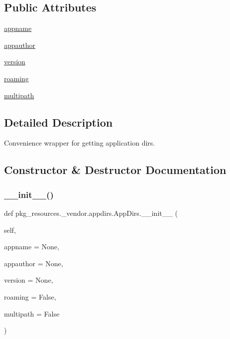 \subsection*{Public Attributes}
\begin{DoxyCompactItemize}
\item 
\hyperlink{classpkg__resources_1_1__vendor_1_1appdirs_1_1AppDirs_afed8cca9642ffb41bd6e08a7cd1c078a}{appname}
\item 
\hyperlink{classpkg__resources_1_1__vendor_1_1appdirs_1_1AppDirs_a69ef562eba9aecf3e8d06c73ebb6e1da}{appauthor}
\item 
\hyperlink{classpkg__resources_1_1__vendor_1_1appdirs_1_1AppDirs_af0b4120c1952529d4b9cf453a36a1939}{version}
\item 
\hyperlink{classpkg__resources_1_1__vendor_1_1appdirs_1_1AppDirs_aaa511bab76ea5c82e80096050df5ce87}{roaming}
\item 
\hyperlink{classpkg__resources_1_1__vendor_1_1appdirs_1_1AppDirs_a4292bc9bd6d97a7a696f731d4955ebf9}{multipath}
\end{DoxyCompactItemize}


\subsection{Detailed Description}
\begin{DoxyVerb}Convenience wrapper for getting application dirs.\end{DoxyVerb}
 

\subsection{Constructor \& Destructor Documentation}
\mbox{\label{classpkg__resources_1_1__vendor_1_1appdirs_1_1AppDirs_a21e4f9ef5ad4d889cec45a9818511fee}} 
\subsubsection{\texorpdfstring{\+\_\+\+\_\+init\+\_\+\+\_\+()}{\_\_init\_\_()}}
{\footnotesize\ttfamily def pkg\+\_\+resources.\+\_\+vendor.\+appdirs.\+App\+Dirs.\+\_\+\+\_\+init\+\_\+\+\_\+ (\begin{DoxyParamCaption}\item[{}]{self,  }\item[{}]{appname = {\ttfamily None},  }\item[{}]{appauthor = {\ttfamily None},  }\item[{}]{version = {\ttfamily None},  }\item[{}]{roaming = {\ttfamily False},  }\item[{}]{multipath = {\ttfamily False} }\end{DoxyParamCaption})}




